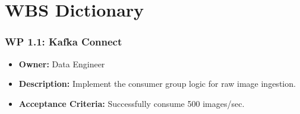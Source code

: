 \documentclass[
]{report}
\author{}
\date{}
\providecommand{\tightlist}{%
  \setlength{\itemsep}{0pt}\setlength{\parskip}{0pt}}
\begin{document}
\newcommand{\theProjectName}{NOAA}
\newcommand{\theAuthor}{Rodrigo Souza dos Santos}

\chapter{WBS Dictionary}\label{wbs-dictionary}

\subsection{WP 1.1: Kafka Connect}\label{wp-1.1-kafka-connect}

\begin{itemize}
\tightlist
\item
  \textbf{Owner:} Data Engineer
\item
  \textbf{Description:} Implement the consumer group logic for raw image
  ingestion.
\item
  \textbf{Acceptance Criteria:} Successfully consume 500 images/sec.
\end{itemize}
\end{document}
